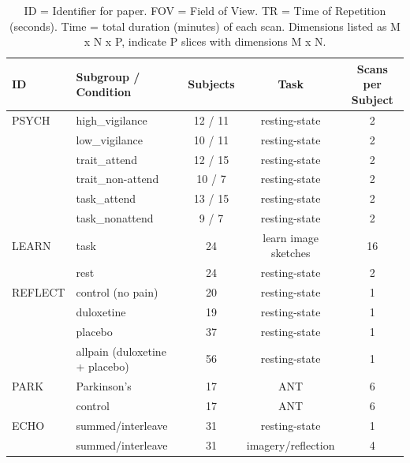 \documentclass[NETN,manuscript]{stjour-new}
\begin{document}
\begin{table}[h!]
\small
\centering
\begin{tabular}{ l l c c c }
\hline
\textbf{ID}  & \textbf{Subgroup / Condition}  & \textbf{Subjects}  & \textbf{Task} & \textbf{Scans per Subject} \\
\hline
PSYCH   &  high\_vigilance    & 12 / 11 & resting-state                    & 2 \\
        &  low\_vigilance     & 10 / 11 & resting-state                    & 2 \\
        &  trait\_attend      & 12 / 15 & resting-state                    & 2 \\
        &  trait\_non-attend  & 10 / 7  & resting-state                    & 2 \\
        &  task\_attend       & 13 / 15 & resting-state                    & 2 \\
        &  task\_nonattend    &  9 / 7  & resting-state                    & 2 \\
\hline
LEARN   &  task              & 24      & learn image sketches & 16 \\
        &  rest              & 24      & resting-state                    & 2 \\
\hline
REFLECT &  control (no pain) & 20      & resting-state                    & 1 \\
        &  duloxetine        & 19      & resting-state                    & 1 \\
        &  placebo           & 37      & resting-state                    & 1 \\
        &  allpain (duloxetine + placebo) & 56         & resting-state    & 1 \\
\hline
PARK    &  Parkinson's       & 17      & ANT                              & 6 \\
        &  control           & 17      & ANT                              & 6 \\
\hline
ECHO    &  summed/interleave & 31      & resting-state                    & 1 \\
        &  summed/interleave & 31      & imagery/reflection               & 4 \\
\hline
\end{tabular}
\caption{
    ID = Identifier for paper. FOV = Field of View. TR = Time of Repetition (seconds).
    Time = total duration (minutes) of each scan. Dimensions listed as M x N x P,
    indicate P slices with dimensions M x N.
}
\label{table:2}
\end{table}
\end{document}
